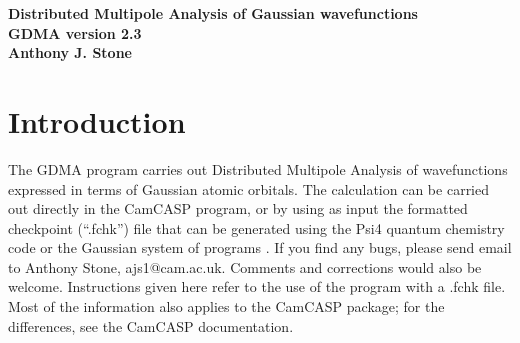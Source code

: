 \documentclass[12pt,txfonts]{paper}
\let\cite=\citep
\begin{document}
\begin{center}
\textbf{Distributed Multipole Analysis of Gaussian wavefunctions\\[3pt]
GDMA version 2.3\\[4 pt]
Anthony J. Stone}
\end{center}

\section{Introduction}

The GDMA program carries out Distributed Multipole Analysis of
wavefunctions expressed in terms of Gaussian atomic orbitals.
The calculation can be carried out directly in the CamCASP
program\cite{CamCASP7.0}, or
by using as input the formatted checkpoint (``.fchk'') file
that can be generated using the Psi4 quantum chemistry code\cite{Psi4-1.4} or the
Gaussian system of programs\cite{Gaussian16}
.
If you find any bugs, please send email to Anthony
Stone, ajs1@cam.ac.uk. Comments and corrections would also be welcome.
Instructions given here refer to the use of the program with a .fchk file.
Most of the information also applies to the {\sc CamCASP} package; for
the differences, see the {\sc CamCASP} documentation.
\end{document}
